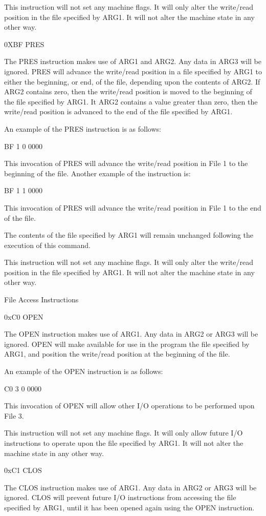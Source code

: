 \documentclass[]{article}
\begin{document}
This instruction will not set any machine flags. It will only alter the
write/read position in the file specified by ARG1. It will not alter the
machine state in any other way.

0XBF PRES

The PRES instruction makes use of ARG1 and ARG2. Any data in ARG3 will
be ignored. PRES will advance the write/read position in a file
specified by ARG1 to either the beginning, or end, of the file,
depending upon the contents of ARG2. If ARG2 contains zero, then the
write/read position is moved to the beginning of the file specified by
ARG1. It ARG2 contains a value greater than zero, then the write/read
position is advanced to the end of the file specified by ARG1.

An example of the PRES instruction is as follows:

BF 1 0 0000

This invocation of PRES will advance the write/read position in File 1
to the beginning of the file. Another example of the instruction is:

BF 1 1 0000

This invocation of PRES will advance the write/read position in File 1
to the end of the file.

The contents of the file specified by ARG1 will remain unchanged
following the execution of this command.

This instruction will not set any machine flags. It will only alter the
write/read position in the file specified by ARG1. It will not alter the
machine state in any other way.

File Access Instructions

0xC0 OPEN

The OPEN instruction makes use of ARG1. Any data in ARG2 or ARG3 will be
ignored. OPEN will make available for use in the program the file
specified by ARG1, and position the write/read position at the beginning
of the file.~

An example of the OPEN instruction is as follows:

C0 3 0 0000

This invocation of OPEN will allow other I/O operations to be performed
upon File 3.

This instruction will not set any machine flags. It will only allow
future I/O instructions to operate upon the file specified by ARG1. It
will not alter the machine state in any other way.

0xC1 CLOS

The CLOS instruction makes use of ARG1. Any data in ARG2 or ARG3 will be
ignored. CLOS will prevent future I/O instructions from accessing the
file specified by ARG1, until it has been opened again using the OPEN
instruction. ~
\end{document}
